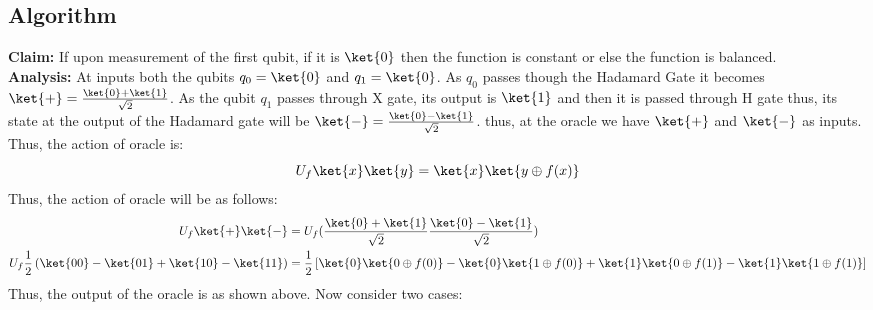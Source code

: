 \documentclass[12pt, oneside]{book}
\theoremstyle{definition}
\theoremstyle{definition}
\theoremstyle{remark}
\begin{document}
\subsection{Algorithm}
\textbf{Claim: }If upon measurement of the first qubit, if it is $\ket{0}$ then the function is constant or else the function is balanced.
\\
\textbf{Analysis: }At inputs both the qubits $q_0=\ket{0}$ and $q_1=\ket{0}$. As $q_0$ passes though the Hadamard Gate it becomes $\ket{+}=\frac{\ket{0}+\ket{1}}{\sqrt{2}}$.
As the qubit $q_1$ passes through X gate, its output is $\ket{1}$ and then it is passed through H gate thus, its state at the output of the Hadamard gate will be $\ket{-}= \frac{\ket{0}-\ket{1}}{\sqrt{2}}$.
thus, at the oracle we have $\ket{+}$ and $\ket{-}$ as inputs. Thus, the action of oracle is:
\[
    U_f\ket{x}\ket{y}=\ket{x}\ket{y\oplus f(x)}
\]
Thus, the action of oracle will be as follows:
\begin{align*}
    U_f\ket{+}\ket{-}&=U_f(\frac{\ket{0}+\ket{1}}{\sqrt{2}}\frac{\ket{0}-\ket{1}}{\sqrt{2}})\\
    U_f\frac{1}{2}\left(\ket{00}-\ket{01}+\ket{10}-\ket{11}\right)&=\frac{1}{2}\left[\ket{0}\ket{0\oplus f(0)}-\ket{0}\ket{1\oplus f(0)}+\ket{1}\ket{0\oplus f(1)}-\ket{1}\ket{1\oplus f(1)}\right]
\end{align*}
Thus, the output of the oracle is as shown above.
Now consider two cases:
\end{document}
